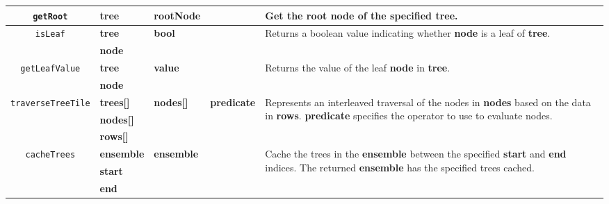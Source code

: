 \begin{table*}[htb]
{\begin{tabularx}{\linewidth}{c | l | l | l | l}
   \midrule
   \multirow{1}{*}{\texttt{getRoot}} & \textbf{tree} & \textbf{rootNode} &  & \multirow{1}{*}{\parbox{0.47\linewidth}{Get the root node of the specified tree.}} \\   

   \midrule
   \multirow{2}{*}{\texttt{isLeaf}} & \textbf{tree} & \textbf{bool} &  & \multirow{2}{*}{\parbox{0.47\linewidth}{Returns a boolean value indicating whether \textbf{node} is a leaf of \textbf{tree}.}} \\   
                                    & \textbf{node} &                 &   & \\                                                                                                                       

   \midrule
   \multirow{2}{*}{\texttt{getLeafValue}} & \textbf{tree} & \textbf{value} &  & \multirow{2}{*}{\parbox{0.47\linewidth}{Returns the value of the leaf \textbf{node} in \textbf{tree}.}} \\   
                                    & \textbf{node} &                 &   & \\                                                                                                                       

   \midrule
   \multirow{3}{*}{\texttt{traverseTreeTile}} & \textbf{trees[]} & \textbf{nodes[] }& \textbf{predicate}   & \multirow{3}{*}{\parbox{0.47\linewidth}{Represents an interleaved traversal of the   
                                                                                                                    nodes in \textbf{nodes} based on the data in \textbf{rows}. \textbf{predicate} specifies 
                                                                                                                    the operator to use to evaluate nodes.}} \\
                                                  & \textbf{nodes[]}  &             &               &  \\
                                                  & \textbf{rows[]}   &             &               & \\

   \midrule
   \multirow{3}{*}{\texttt{cacheTrees}} & \textbf{ensemble} & \textbf{ensemble}&     & \multirow{3}{*}{\parbox{0.47\linewidth}{Cache the trees in the \textbf{ensemble} between the specified \textbf{start} and \textbf{end} indices.   
                                                                                                                    The returned \textbf{ensemble} has the specified trees cached.}} \\
                                                  & \textbf{start}  &             &               &  \\
                                                  & \textbf{end}   &             &               & \\


\end{tabularx}}
\end{table*}
